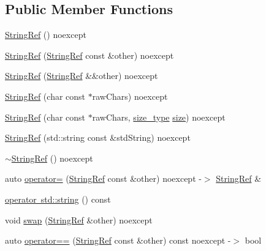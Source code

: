 \subsection*{Public Member Functions}
\begin{DoxyCompactItemize}
\item 
\mbox{\hyperlink{class_catch_1_1_string_ref_a94319c75df6542327c93a312c6a80754}{String\+Ref}} () noexcept
\item 
\mbox{\hyperlink{class_catch_1_1_string_ref_a2f287267c3a988b288bfd910667c1cfc}{String\+Ref}} (\mbox{\hyperlink{class_catch_1_1_string_ref}{String\+Ref}} const \&other) noexcept
\item 
\mbox{\hyperlink{class_catch_1_1_string_ref_a407d5737b94e5a374add5c2794589733}{String\+Ref}} (\mbox{\hyperlink{class_catch_1_1_string_ref}{String\+Ref}} \&\&other) noexcept
\item 
\mbox{\hyperlink{class_catch_1_1_string_ref_aea45f5089c53adac362bff6bd7c40943}{String\+Ref}} (char const $\ast$raw\+Chars) noexcept
\item 
\mbox{\hyperlink{class_catch_1_1_string_ref_a320bf235274ebb90dd6af80485af2797}{String\+Ref}} (char const $\ast$raw\+Chars, \mbox{\hyperlink{class_catch_1_1_string_ref_a06b4db8fc82b197004291cf370b2ba7c}{size\+\_\+type}} \mbox{\hyperlink{class_catch_1_1_string_ref_ae084d72cb2952cee61a63ef36611d0ad}{size}}) noexcept
\item 
\mbox{\hyperlink{class_catch_1_1_string_ref_a7fe41469048f906e9a847798cd335f23}{String\+Ref}} (std\+::string const \&std\+String) noexcept
\item 
\mbox{\hyperlink{class_catch_1_1_string_ref_a387795c6d883d7281befe5e82920faf8}{$\sim$\+String\+Ref}} () noexcept
\item 
auto \mbox{\hyperlink{class_catch_1_1_string_ref_a14d5a1983e33c51c6b5fd33bffbebabb}{operator=}} (\mbox{\hyperlink{class_catch_1_1_string_ref}{String\+Ref}} const \&other) noexcept -\/$>$ \mbox{\hyperlink{class_catch_1_1_string_ref}{String\+Ref}} \&
\item 
\mbox{\hyperlink{class_catch_1_1_string_ref_ad9fde21785affacc32d7da7a70d74e93}{operator std\+::string}} () const
\item 
void \mbox{\hyperlink{class_catch_1_1_string_ref_a8a843e39ad3560d10a80524ed926ed63}{swap}} (\mbox{\hyperlink{class_catch_1_1_string_ref}{String\+Ref}} \&other) noexcept
\item 
auto \mbox{\hyperlink{class_catch_1_1_string_ref_aabb30149ab961187e4b3ff3394bf6e73}{operator==}} (\mbox{\hyperlink{class_catch_1_1_string_ref}{String\+Ref}} const \&other) const noexcept -\/$>$ bool

\end{DoxyCompactItemize}
